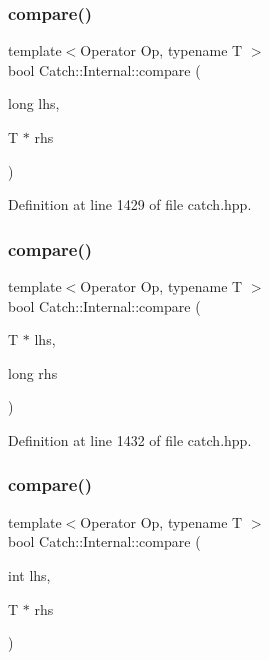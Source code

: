 \subsubsection{\texorpdfstring{compare()}{compare()}\hspace{0.1cm}{\footnotesize\ttfamily [14/17]}}
{\footnotesize\ttfamily template$<$Operator Op, typename T $>$ \\
bool Catch\+::\+Internal\+::compare (\begin{DoxyParamCaption}\item[{long}]{lhs,  }\item[{T $\ast$}]{rhs }\end{DoxyParamCaption})}



Definition at line 1429 of file catch.\+hpp.

\hypertarget{namespace_catch_1_1_internal_a3f89c65fdb06aa7b648c5acf0ca107a9}{}\label{namespace_catch_1_1_internal_a3f89c65fdb06aa7b648c5acf0ca107a9} 
\subsubsection{\texorpdfstring{compare()}{compare()}\hspace{0.1cm}{\footnotesize\ttfamily [15/17]}}
{\footnotesize\ttfamily template$<$Operator Op, typename T $>$ \\
bool Catch\+::\+Internal\+::compare (\begin{DoxyParamCaption}\item[{T $\ast$}]{lhs,  }\item[{long}]{rhs }\end{DoxyParamCaption})}



Definition at line 1432 of file catch.\+hpp.

\hypertarget{namespace_catch_1_1_internal_a4f30c29e4adb62c7e209e5b988e59397}{}\label{namespace_catch_1_1_internal_a4f30c29e4adb62c7e209e5b988e59397} 
\subsubsection{\texorpdfstring{compare()}{compare()}\hspace{0.1cm}{\footnotesize\ttfamily [16/17]}}
{\footnotesize\ttfamily template$<$Operator Op, typename T $>$ \\
bool Catch\+::\+Internal\+::compare (\begin{DoxyParamCaption}\item[{int}]{lhs,  }\item[{T $\ast$}]{rhs }\end{DoxyParamCaption})}



